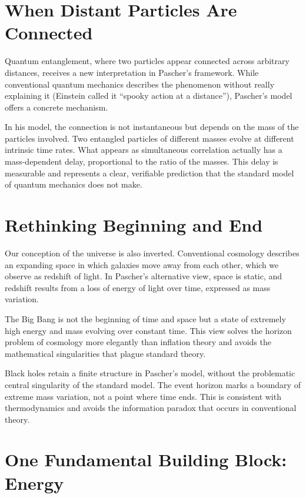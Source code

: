 \documentclass[a4paper,12pt]{article}
\begin{document}
	\section{When Distant Particles Are Connected}
	
	Quantum entanglement, where two particles appear connected across arbitrary distances, receives a new interpretation in Pascher's framework. While conventional quantum mechanics describes the phenomenon without really explaining it (Einstein called it ``spooky action at a distance''), Pascher's model offers a concrete mechanism.
	
	In his model, the connection is not instantaneous but depends on the mass of the particles involved. Two entangled particles of different masses evolve at different intrinsic time rates. What appears as simultaneous correlation actually has a mass-dependent delay, proportional to the ratio of the masses. This delay is measurable and represents a clear, verifiable prediction that the standard model of quantum mechanics does not make.
	
	\section{Rethinking Beginning and End}
	
	Our conception of the universe is also inverted. Conventional cosmology describes an expanding space in which galaxies move away from each other, which we observe as redshift of light. In Pascher's alternative view, space is static, and redshift results from a loss of energy of light over time, expressed as mass variation.
	
	The Big Bang is not the beginning of time and space but a state of extremely high energy and mass evolving over constant time. This view solves the horizon problem of cosmology more elegantly than inflation theory and avoids the mathematical singularities that plague standard theory.
	
	Black holes retain a finite structure in Pascher's model, without the problematic central singularity of the standard model. The event horizon marks a boundary of extreme mass variation, not a point where time ends. This is consistent with thermodynamics and avoids the information paradox that occurs in conventional theory.
	
	\section{One Fundamental Building Block: Energy}
	
\end{document}
